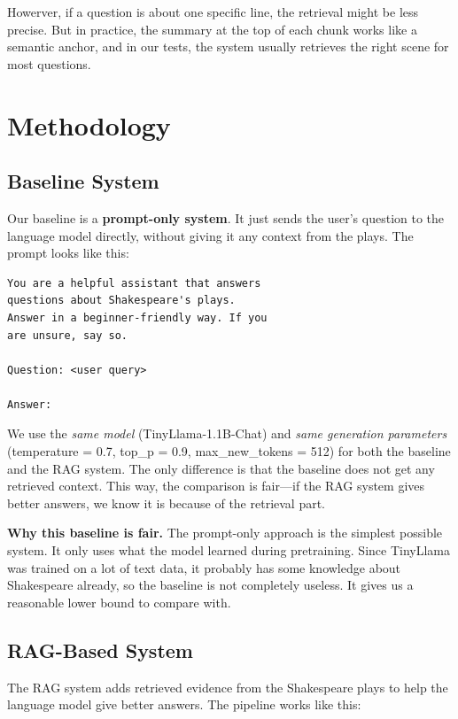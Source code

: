 \documentclass[10pt,conference]{IEEEtran}
\begin{document}
Howerver, if a question is about one specific line, the retrieval might be less precise. But in practice, the summary at the top of each chunk works like a semantic anchor, and in our tests, the system usually retrieves the right scene for most questions.

\section{Methodology}
\label{sec:methodology}

\subsection{Baseline System}

Our baseline is a \textbf{prompt-only system}. It just sends the user's question to the language model directly, without giving it any context from the plays. The prompt looks like this:

\begin{lstlisting}[language={}]
You are a helpful assistant that answers
questions about Shakespeare's plays.
Answer in a beginner-friendly way. If you
are unsure, say so.

Question: <user query>

Answer:
\end{lstlisting}

We use the \textit{same model} (TinyLlama-1.1B-Chat) and \textit{same generation parameters} (temperature = 0.7, top\_p = 0.9, max\_new\_tokens = 512) for both the baseline and the RAG system. The only difference is that the baseline does not get any retrieved context. This way, the comparison is fair---if the RAG system gives better answers, we know it is because of the retrieval part.

\textbf{Why this baseline is fair.} The prompt-only approach is the simplest possible system. It only uses what the model learned during pretraining. Since TinyLlama was trained on a lot of text data, it probably has some knowledge about Shakespeare already, so the baseline is not completely useless. It gives us a reasonable lower bound to compare with.

\subsection{RAG-Based System}

The RAG system adds retrieved evidence from the Shakespeare plays to help the language model give better answers. The pipeline works like this:
\end{document}
